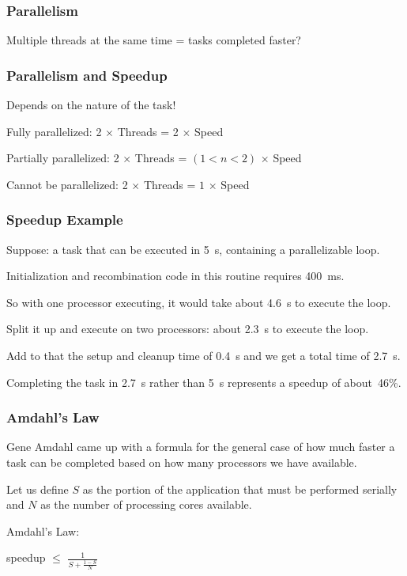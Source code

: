  

\begin{frame}
\frametitle{Parallelism}

Multiple threads at the same time = tasks completed faster?

\end{frame}

\begin{frame}
\frametitle{Parallelism and Speedup}

Depends on the nature of the task!

Fully parallelized: 2 $\times$ Threads = 2 $\times$ Speed

Partially parallelized: 2 $\times$ Threads = $(1 < n < 2)$ $\times$ Speed

Cannot be parallelized: 2 $\times$ Threads = $1$ $\times$ Speed

\end{frame}

 
\begin{frame}
\frametitle{Speedup Example}


Suppose: a task that can be executed in 5~s, containing a parallelizable loop.

Initialization and recombination code in this routine requires 400~ms. 

So with one processor executing, it would take about 4.6~s to execute the loop. 

Split it up and execute on two processors: about 2.3~s to execute the loop. 

Add to that the setup and cleanup time of 0.4~s and we get a total time of 2.7~s. 

Completing the task in 2.7~s rather than 5~s represents a speedup of about~46\%.

\end{frame}

 
\begin{frame}
\frametitle{Amdahl's Law}

Gene Amdahl came up with a formula for the general case of how much faster a task can be completed based on how many processors we have available. 

Let us define $S$ as the portion of the application that must be performed serially and $N$ as the number of processing cores available. 

Amdahl's Law:

\begin{center}
speedup $\leq$ {\huge $\frac{1}{S + \frac{1-S}{N}}$}
\end{center}

\end{frame}

